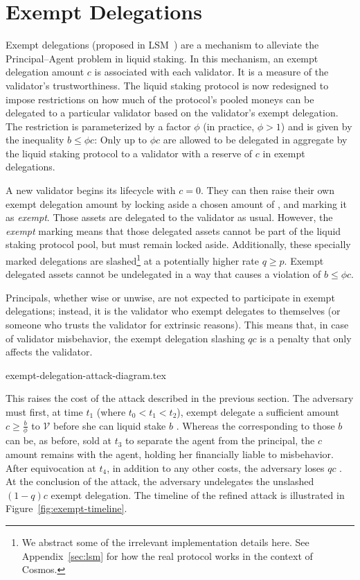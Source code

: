 \section{Exempt Delegations}

Exempt delegations (proposed in LSM~\cite{liquidity-staking-module})
are a mechanism to alleviate the Principal--Agent problem in liquid staking.
In this mechanism, an exempt delegation amount $c$ \asset is associated
with each validator. It is a measure of the validator's trustworthiness.
The liquid staking protocol is now redesigned to impose restrictions
on how much of the protocol's pooled moneys can be delegated to a particular
validator based on the validator's exempt delegation.
The restriction is
parameterized by a factor $\phi$ (in practice, $\phi > 1$)
and is given by the inequality $b \leq \phi c$: Only up to $\phi c$ \assets
are allowed to be delegated in aggregate by the liquid staking protocol
to a validator with a reserve of $c$ \asset in exempt delegations.

A new validator begins its lifecycle with $c = 0$. They can then
raise their own exempt delegation amount by locking aside a
chosen amount of \asset, and marking it as \emph{exempt}. Those
assets are delegated to the validator as usual. However,
the \emph{exempt}
marking means that those delegated assets cannot be part of the liquid
staking protocol pool, but must remain locked aside. Additionally,
these specially marked delegations are slashed\footnote{We abstract some
of the irrelevant implementation details here. See Appendix~\ref{sec:lsm}
for how the real protocol works in the context of Cosmos.}
at a potentially higher rate $q \geq p$. Exempt delegated assets cannot
be undelegated in a way that causes a violation of $b \leq \phi c$.

Principals, whether wise or unwise, are not expected to participate in exempt
delegations; instead, it is the validator who exempt delegates to
themselves (or someone who trusts the validator for extrinsic reasons).
This means that, in case of validator misbehavior, the exempt delegation
slashing $qc$ is a penalty that only affects the validator.

{exempt-delegation-attack-diagram.tex}

This raises
the cost of the attack described in the previous section. The
adversary must first, at time $t_1$ (where $t_0 < t_1 < t_2$), exempt delegate a sufficient amount
$c \geq \frac{b}{\phi}$ \asset to $\mathcal{V}$ before she can liquid stake $b$ \asset.
Whereas the \stassets
corresponding to those $b$ \assets can be, as before, sold at $t_3$ to
separate the agent from the principal, the $c$ amount remains with the
agent, holding her financially liable to misbehavior. After equivocation at $t_4$,
in addition to any other costs, the adversary loses $qc$ \asset. At the conclusion
of the attack, the adversary undelegates the unslashed $(1 - q)c$ \asset exempt delegation.
The timeline of the refined attack is illustrated in Figure~\ref{fig:exempt-timeline}.

